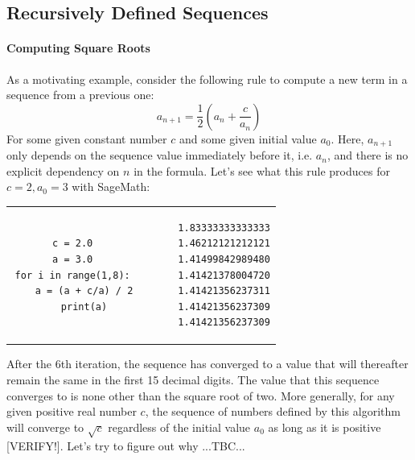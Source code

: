 \subsection{Recursively Defined Sequences}


\paragraph{Computing Square Roots}
As a motivating example, consider the following rule to compute a new term in a sequence from a previous one:
\begin{equation}
a_{n+1} = \frac{1}{2} \left( a_n + \frac{c}{a_n}  \right)
\end{equation}
For some given constant number $c$ and some given initial value $a_0$. Here, $a_{n+1}$ only depends on the sequence value immediately before it, i.e. $a_n$, and there is no explicit dependency on $n$ in the formula. Let's see what this rule produces for $c = 2, a_0 = 3$ with SageMath:
\begin{center}
\begin{tabular}{ ccccc } 
\begin{lstlisting}
c = 2.0
a = 3.0
for i in range(1,8):
    a = (a + c/a) / 2
    print(a)
\end{lstlisting}
& & \vline & &
\begin{lstlisting}
1.83333333333333
1.46212121212121
1.41499842989480
1.41421378004720
1.41421356237311
1.41421356237309
1.41421356237309
\end{lstlisting}
\end{tabular}
\end{center}
After the 6th iteration, the sequence has converged to a value that will thereafter remain the same in the first 15 decimal digits. The value that this sequence converges to is none other than the square root of two. More generally, for any given positive real number $c$, the sequence of numbers defined by this algorithm will converge to $\sqrt{c}$ regardless of the initial value $a_0$ as long as it is positive [VERIFY!]. Let's try to figure out why ...TBC...



